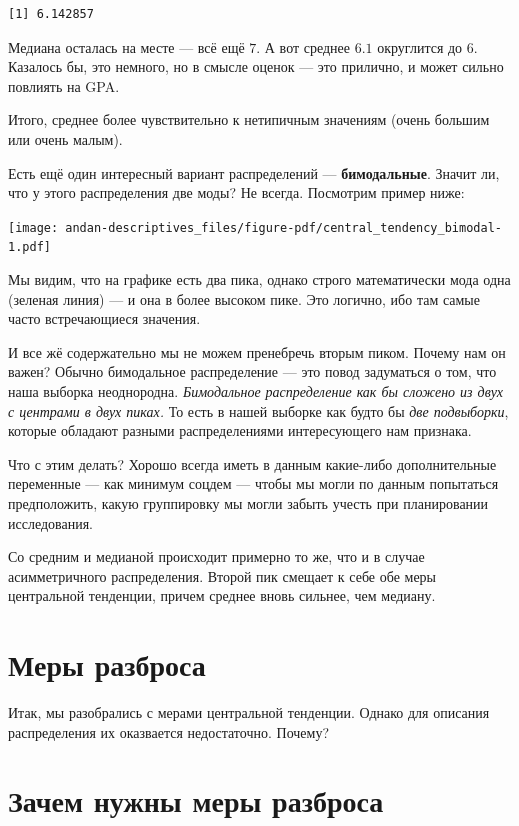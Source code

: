 \documentclass[
  letterpaper,
  DIV=11,
  numbers=noendperiod]{scrreprt}
\theoremstyle{definition}
\theoremstyle{remark}
\begin{document}
\begin{verbatim}
[1] 6.142857
\end{verbatim}

Медиана осталась на месте --- всё ещё \(7\). А вот среднее \(6.1\)
округлится до \(6\). Казалось бы, это немного, но в смысле оценок ---
это прилично, и может сильно повлиять на GPA.

Итого, среднее более чувствительно к нетипичным значениям (очень большим
или очень малым).

Есть ещё один интересный вариант распределений --- \textbf{бимодальные}.
Значит ли, что у этого распределения две моды? Не всегда. Посмотрим
пример ниже:

\texttt{[image: andan-descriptives\_files/figure-pdf/central\_tendency\_bimodal-1.pdf]}

Мы видим, что на графике есть два пика, однако строго математически мода
одна (зеленая линия) --- и она в более высоком пике. Это логично, ибо
там самые часто встречающиеся значения.

И все жё содержательно мы не можем пренебречь вторым пиком. Почему нам
он важен? Обычно бимодальное распределение --- это повод задуматься о
том, что наша выборка неоднородна. \emph{Бимодальное распределение как
бы сложено из двух с центрами в двух пиках.} То есть в нашей выборке как
будто бы \emph{две подвыборки}, которые обладают разными распределениями
интересующего нам признака.

Что с этим делать? Хорошо всегда иметь в данным какие-либо
дополнительные переменные --- как минимум соцдем --- чтобы мы могли по
данным попытаться предположить, какую группировку мы могли забыть учесть
при планировании исследования.

Со средним и медианой происходит примерно то же, что и в случае
асимметричного распределения. Второй пик смещает к себе обе меры
центральной тенденции, причем среднее вновь сильнее, чем медиану.

\section{Меры разброса}\label{andan-descriptives-variability}

Итак, мы разобрались с мерами центральной тенденции. Однако для описания
распределения их оказвается недостаточно. Почему?

\section{Зачем нужны меры разброса}\label{why_we_need_variation}
\end{document}
